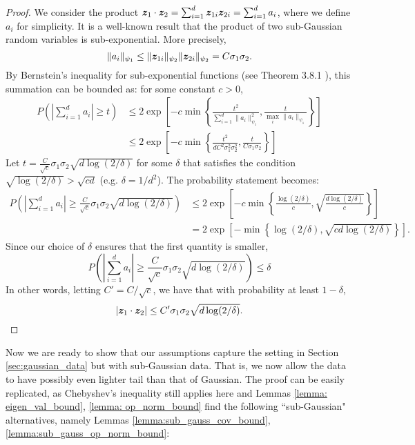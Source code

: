 \begin{proof}
   We consider the product ${\bm{z}}_1 \cdot {\bm{z}}_2 = \sum_{i=1}^d {\bm{z}}_{1i}{\bm{z}}_{2i} = \sum_{i=1}^d a_i$, where we define $a_i$ for simplicity. It is a well-known result that the product of two sub-Gaussian random variables is sub-exponential. More precisely, 
    \[
        \|a_i\|_{\psi_1} \leq \|{\bm{z}}_{1i}\|_{\psi_2}\|{\bm{z}}_{2i}\|_{\psi_2} = C\sigma_1\sigma_2. 
    \]
    By Bernstein's inequality for sub-exponential functions (see Theorem 3.8.1 \cite{vershynin2018high}), this summation can be bounded as: for some constant $c > 0$, 
    \begin{align*}
        P\left( \left| \sum_{i=1}^d a_i \right| \geq t\right) & \leq 2 \exp \left[ -c \min  \left\{ \frac{t^2}{\sum_{i=1}^d \|a_i\|_{\psi_1}^2}, \frac{t}{ \max_i \|a_i\|_{\psi_1}}\right\}\right] \\
        & \leq  2 \exp \left[ -c \min  \left\{ \frac{t^2}{dC^2\sigma_1^2\sigma_2^2}, \frac{t}{ C\sigma_1\sigma_2}\right\}\right]
    \end{align*}
    Let $t = \frac{C}{\sqrt{c}}\sigma_1\sigma_2\sqrt{d\log(2/\delta)}$ for some $\delta$ that satisfies the condition $\sqrt{\log(2/\delta)} > \sqrt{cd}$ (e.g. $\delta = 1/d^2$). The probability statement becomes: 
    \begin{align*}
        P\left( \left| \sum_{i=1}^d a_i \right| \geq \frac{C}{\sqrt{c}}\sigma_1\sigma_2\sqrt{d\log(2/\delta)} \right) & \leq 2 \exp \left[ -c \min  \left\{ \frac{\log(2/\delta)}{c} ,  \sqrt{\frac{d\log(2/\delta)}{c}} \right\}\right] \\
        & = 2 \exp \left[ -\min  \left\{ \log(2/\delta) ,  \sqrt{cd\log(2/\delta)} \right\}\right]. 
    \end{align*}
    Since our choice of $\delta$ ensures that the first quantity is smaller,  
    \[
        P\left( \left| \sum_{i=1}^d a_i \right| \geq \frac{C}{\sqrt{c}}\sigma_1\sigma_2\sqrt{d\log(2/\delta)} \right) \leq \delta
    \]
    In other words, letting $C' = C/\sqrt{c}$, we have that with probability at least $1-\delta$, 
    \[
        |{\bm{z}}_1 \cdot {\bm{z}}_2| \leq C'\sigma_1\sigma_2\sqrt{d\log(2/\delta)}.
    \]
\end{proof}

Now we are ready to show that our assumptions capture the setting in Section \ref{sec:gaussian_data} but with sub-Gaussian data. That is, we now allow the data to have possibly even lighter tail than that of Gaussian. The proof can be easily replicated, as Chebyshev's inequality still applies here and Lemmas \ref{lemma: eigen_val_bound}, \ref{lemma: op_norm_bound} find the following ``sub-Gaussian" alternatives, namely Lemmas \ref{lemma:sub_gauss_cov_bound}, \ref{lemma:sub_gauss_op_norm_bound}: 

